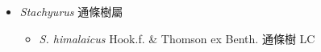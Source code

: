 
  \begin{itemize}
 \item[] \textit{Stachyurus} 通條樹屬
                                
  \begin{itemize}
        \item[] \textit{S. himalaicus} Hook.f. \& Thomson ex Benth.  通條樹   LC
  \end{itemize}
  \end{itemize}

